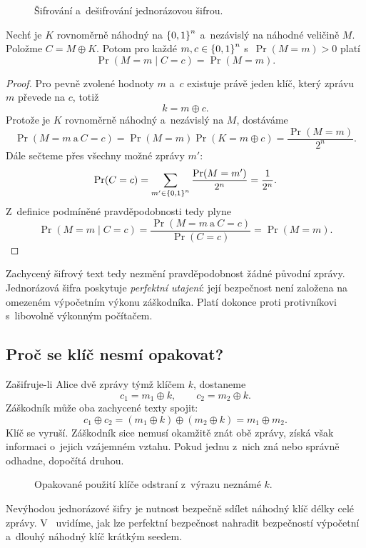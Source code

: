 \begin{figure}[ht]
    \centering
    
    \caption{Šifrování a~dešifrování jednorázovou šifrou.}
    \label{fig:krypto-otp}
\end{figure}

\begin{proposition}
    Nechť je $K$ rovnoměrně náhodný na $\left\{0,1\right\}^{n}$ a~nezávislý na náhodné veličině $M$. Položme $C=M\oplus K$. Potom pro každé $m,c\in\left\{0,1\right\}^{n}$ s~$\Pr(M=m)>0$ platí
    \[
        \Pr(M=m\mid C=c)=\Pr(M=m).
    \]
\end{proposition}

\begin{proof}
    Pro pevně zvolené hodnoty $m$ a~$c$ existuje právě jeden klíč, který zprávu $m$ převede na $c$, totiž
    \[
        k=m\oplus c.
    \]
    Protože je $K$ rovnoměrně náhodný a~nezávislý na $M$, dostáváme
    \[
        \Pr(M=m\ \text{a}\ C=c)
        =
        \Pr(M=m)\Pr(K=m\oplus c)
        =
        \frac{\Pr(M=m)}{2^n}.
    \]
    Dále sečteme přes všechny možné zprávy $m'$:
    \[
        \Pr(C=c)
        =
        \sum_{m'\in\left\{0,1\right\}^{n}}
        \frac{\Pr(M=m')}{2^n}
        =
        \frac{1}{2^n}.
    \]
    Z~definice podmíněné pravděpodobnosti tedy plyne
    \[
        \Pr(M=m\mid C=c)
        =
        \frac{\Pr(M=m\ \text{a}\ C=c)}{\Pr(C=c)}
        =
        \Pr(M=m).
    \]
\end{proof}

Zachycený šifrový text tedy nezmění pravděpodobnost žádné původní zprávy. Jednorázová šifra poskytuje \emph{perfektní utajení}: její bezpečnost není založena na omezeném výpočetním výkonu záškodníka. Platí dokonce proti protivníkovi s~libovolně výkonným počítačem.


\subsection{Proč se klíč nesmí opakovat?}

Zašifruje-li Alice dvě zprávy týmž klíčem $k$, dostaneme
\[
    c_1=m_1\oplus k,
    \qquad
    c_2=m_2\oplus k.
\]
Záškodník může oba zachycené texty spojit:
\[
    c_1\oplus c_2
    =
    (m_1\oplus k)\oplus(m_2\oplus k)
    =
    m_1\oplus m_2.
\]
Klíč se vyruší. Záškodník sice nemusí okamžitě znát obě zprávy, získá však informaci o~jejich vzájemném vztahu. Pokud jednu z~nich zná nebo správně odhadne, dopočítá druhou.

\begin{figure}[ht]
    \centering
    
    \caption{Opakované použití klíče odstraní z~výrazu neznámé $k$.}
    \label{fig:krypto-opakovany-klic}
\end{figure}

Nevýhodou jednorázové šifry je nutnost bezpečně sdílet náhodný klíč délky celé zprávy. V~ uvidíme, jak lze perfektní bezpečnost nahradit bezpečností výpočetní a~dlouhý náhodný klíč krátkým seedem.
